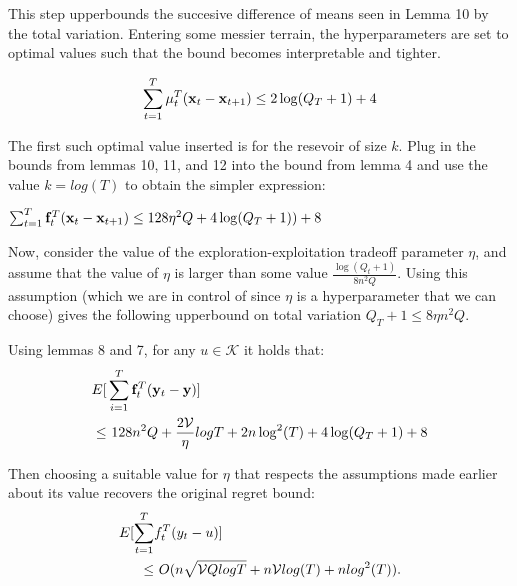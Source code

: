 This step upperbounds the succesive difference of means seen in Lemma 10 by the total variation. 
Entering some messier terrain, the hyperparameters are set to optimal values such that the bound becomes interpretable and tighter.

\begin{clemma}{12}
	\begin{equation}
  		\sum_{t=1}^T {\bf \mu}_t^T ({\bf x}_t - {\bf x}_{t+1}) \leq 2 \log(Q_T + 1) + 4
	\end{equation}
\end{clemma}

The first such optimal value inserted is for the resevoir of size $k$. Plug in the bounds from lemmas 10, 11, and 12 into the bound from lemma 4 and use the value $k=log(T)$ to obtain the simpler expression:

$\sum_{t=1}^T {\bf f}_t^T ({\bf x}_t - {\bf x}_{t+1}) \leq 128 \eta^2Q + 4\log(Q_T +1))+ 8$

Now, consider the value of the exploration-exploitation tradeoff parameter $\eta$, and assume that the value of $\eta$ is larger than some value $\frac{\log(Q_t +1)}{8 n^2 Q}$. Using this assumption (which we are in control of since $\eta$ is a hyperparameter that we can choose) gives the following upperbound on total variation  $Q_T + 1 \leq 8 \eta n^2 Q$.

Using lemmas 8 and 7, for any $u \in \mathcal{K}$ it holds that: 
\begin{align*}
	E[&\sum_{i=1}^T {\bf f}_t^T ({\bf y}_t - {\bf y}) ] \\ 
	\leq&\ 128 n^2Q + \frac{2 \mathcal{V}}{\eta} logT +  2 n\log^2(T) + 4\log(Q_T +1) + 8
\end{align*}

Then choosing a suitable value for $\eta$ that respects the assumptions made earlier about its value recovers the original regret bound:
\begin{align}
  E[\sum_{t=1}^T& f_t^T (y_t - u)] \\
  \leq&\ O(n \sqrt{\mathcal{V}Qlog T} + n \mathcal{V} log(T) + nlog^2(T))\notag.
\end{align}
